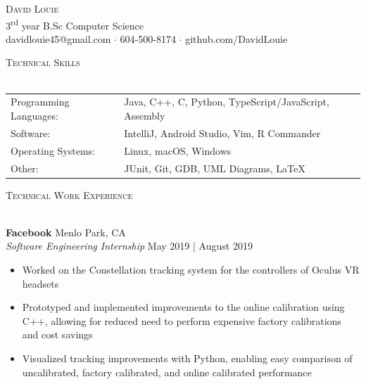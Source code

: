 \documentclass[11pt, twoside]{article}
\newcommand{\lineunder} {
    \vspace*{-8pt} \\
    \hspace*{-18pt} \hrulefill \\
}
\newcommand{\header} [1] {
    {\hspace*{-18pt}\vspace*{6pt} \textsc{#1}}
    \vspace*{-6pt} \lineunder
}
\begin{document}
\vspace*{-10pt}
\begin{center}
	{\Huge \scshape {David Louie}}\\
    3\textsuperscript{rd} year B.Sc Computer Science \\
    davidlouie45@gmail.com $\cdot$ 604-500-8174 $\cdot$ 
    github.com/DavidLouie\\
\end{center}

\header{Technical Skills}
\vspace{2pt}
\begin{tabular}{ l l }
	Programming Languages: & Java, C++, C, Python, TypeScript/JavaScript, Assembly                           \\
	Software:              & IntelliJ, Android Studio, Vim, R Commander \\
	Operating Systems:     & Linux, macOS, Windows                                 \\
	Other:				   & JUnit, Git, GDB, UML Diagrams, LaTeX							   \\
\end{tabular}

\vspace*{2mm}

\header{Technical Work Experience}
\vspace{1mm}

\textbf{Facebook} \hfill Menlo Park, CA\\
\textit{Software Engineering Internship} \hfill May 2019 | August 2019\\
\vspace{-1mm}
\begin{itemize} \itemsep 1pt
	\item Worked on the Constellation tracking system for the controllers of Oculus VR headsets
	\item Prototyped and implemented improvements to the online calibration using C++, allowing for reduced need to perform expensive factory calibrations and cost savings
	\item Visualized tracking improvements with Python, enabling easy comparison of uncalibrated, factory calibrated, and online calibrated performance
\end{itemize}
\end{document}

